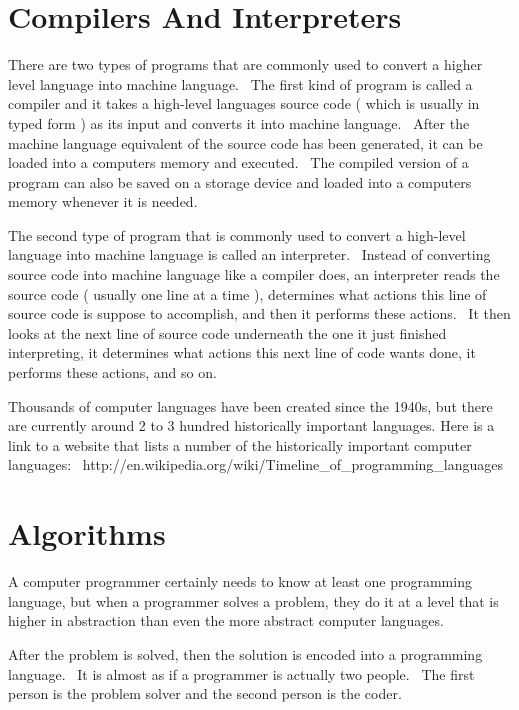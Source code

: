 \documentclass[12pt,twoside]{book}
\begin{document}
\section[Compilers And Interpreters]{Compilers And Interpreters}

There are two types of programs that are commonly used to convert a higher level language into machine language. \ The first kind of program is called a compiler and it takes a high{}-level language{\textquotesingle}s source code ( which is usually in typed form ) as its input and converts it into machine language. \ After the machine language equivalent of the source code has been generated, it can be loaded into a computer{\textquotesingle}s memory and executed. \ The compiled version of a program can also be saved on a storage device and loaded into a computer{\textquotesingle}s memory whenever it is needed.


\bigskip

The second type of program that is commonly used to convert a high{}-level language into machine language is called an interpreter. \ Instead of converting source code into machine language like a compiler does, an interpreter reads the source code ( usually one line at a time ), determines what actions this line of source code is suppose to accomplish, and then it performs these actions. \ It then looks at the next line of source code underneath the one it just finished interpreting, it determines what actions this next line of code wants done, it performs these actions, and so on. 

\bigskip

Thousands of computer languages have been created since the 1940{\textquotesingle}s, but there are currently around 2 to 3 hundred historically important languages. Here is a link to a website that lists a number of the historically important computer languages: \ http://en.wikipedia.org/wiki/Timeline\_of\_programming\_languages 

\section[Algorithms]{Algorithms}

A computer programmer certainly needs to know at least one programming language, but when a programmer solves a problem, they do it at a level that is higher in abstraction than even the more abstract computer languages.


\bigskip

After the problem is solved, then the solution is encoded into a programming language. \ It is almost as if a programmer is actually two people. \ The first person is the problem solver and the second person is the coder. 
\end{document}
